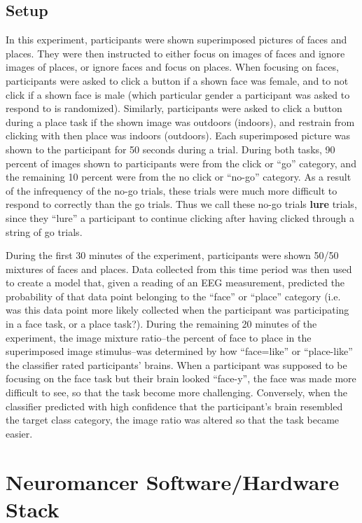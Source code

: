 \documentclass[11pt]{report}
\begin{document}
\subsection{Setup}
In this experiment, participants were shown superimposed pictures of faces and places.  They were then instructed to either focus on images of faces and ignore images of places, or ignore faces and focus on  places.  When focusing on faces, participants were asked to click a button if a shown face was female, and to not click if a shown face is male (which particular gender a participant was asked to respond to is randomized).  Similarly, participants were asked to click a button during a place task if the shown image was outdoors (indoors), and restrain from clicking with then place was indoors (outdoors).  Each superimposed picture was shown to the participant for 50 seconds during a trial.  During both tasks, 90 percent of images shown to participants were from the click or “go” category, and the remaining 10 percent were from the no click or “no-go” category.  As a result of the infrequency of the no-go trials, these trials were much more difficult to respond to correctly than the go trials. Thus we call these no-go trials {\bf lure} trials, since they “lure” a participant to continue clicking after having clicked through a string of go trials.  

During the first 30 minutes of the experiment, participants were shown 50/50 mixtures of faces and places.  Data collected from this time period was then used to create a model that, given a reading of an EEG measurement, predicted the probability of that data point belonging to the “face” or “place” category (i.e. was this data point more likely collected when the participant was participating in a face task, or a place task?).  During the remaining 20 minutes of the experiment, the image mixture ratio--the percent of face to place in the superimposed image stimulus--was determined by how ``face=like'' or ``place-like'' the classifier rated participants' brains.  When a participant was supposed to be focusing on the face task but their brain looked ``face-y'', the face was made more difficult to see, so that the task become more challenging.  Conversely, when the classifier predicted with high confidence that the participant's brain resembled the target class category, the image ratio was altered so that the task became easier.

\section{Neuromancer Software/Hardware Stack}
\end{document}
